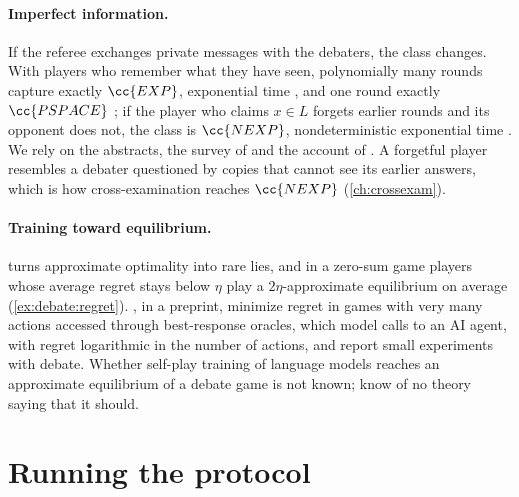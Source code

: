 \begin{refsection}
\paragraph{Imperfect information.} If the referee exchanges private messages with the debaters, the class changes. With players who remember what they have seen, polynomially many rounds capture exactly $\cc{EXP}$, exponential time \parencite{KollerMegiddo1992,FeigenbaumKollerShor1995,FeigeKilian1997}, and one round exactly $\cc{PSPACE}$ \parencite{FeigeKilian1997}; if the player who claims $x\in L$ forgets earlier rounds and its opponent does not, the class is $\cc{NEXP}$, nondeterministic exponential time \parencite{FeigenbaumKollerShor1995}. We rely on the abstracts, the survey of \textcite{Feigenbaum1998} and the account of \textcite{KolRaz2014}. A forgetful player resembles a debater questioned by copies that cannot see its earlier answers, which is how cross-examination reaches $\cc{NEXP}$ (\cref{ch:crossexam}).

\paragraph{Training toward equilibrium.}  turns approximate optimality into rare lies, and in a zero-sum game players whose average regret stays below $\eta$ play a $2\eta$-approximate equilibrium on average (\cref{ex:debate:regret}). \Textcite{ChenEtAl2023}, in a preprint, minimize regret in games with very many actions accessed through best-response oracles, which model calls to an AI agent, with regret logarithmic in the number of actions, and report small experiments with debate. Whether self-play training of language models reaches an approximate equilibrium of a debate game is not known; \textcite[\S5.6]{IrvingEtAl2018} know of no theory saying that it should.

\section{Running the protocol}\label{sec:debate:running}


\end{refsection}
